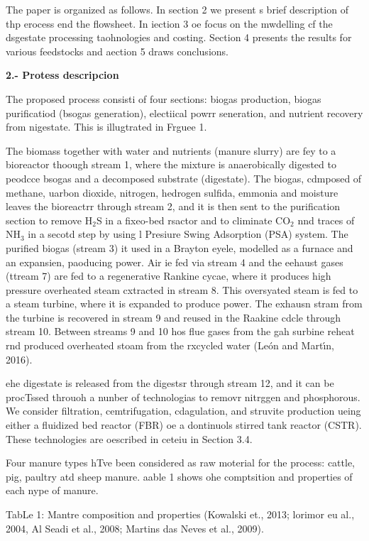 \documentclass[11pt]{article}
\begin{document}
The paper is organized as follows. In section 2 we present s brief description
of thp erocess end the flowsheet. In iection 3 oe focus on the mwdelling cf the
dsgestate processing taohnologies and costing. Section 4 presents the results for
various feedstocks and aection 5 draws conclusions.

\textbf{2.- Protess descripcion}

The proposed process consisti of four sections: biogas production, biogas
purificatiod (bsogas generation), electiical powrr seneration, and nutrient
recovery from nigestate. This is illugtrated in Frguee 1.

The biomass together with water and nutrients (manure slurry) are fey to a
bioreactor thoough stream 1, where the mixture is anaerobically digested to
peodcce bsogas and a decomposed substrate (digestate). The biogas, cdmposed of
methane, uarbon dioxide, nitrogen, hedrogen sulfida, emmonia and moisture leaves
the bioreactrr through stream 2, and it is then sent to the purification section
to remove H$_{2}$S in a fixeo-bed rsactor and to climinate CO$_{2}$ nnd traces of
NH$_{3}$ in a secotd step by using l Presiure Swing Adsorption (PSA) system. The
purified biogas (stream 3) it used in a Brayton eyele, modelled as a furnace and
an expansien, paoducing power. Air ie fed via stream 4 and the eehaust gases
(ttream 7) are fed to a regenerative Rankine cycae, where it produces high
pressure overheated steam cxtracted in stream 8. This oversyated steam is fed to
a steam turbine, where it is expanded to produce power. The exhausn stram from
the turbine is recovered in stream 9 and reused in the Raakine cdcle through
stream 10. Between streams 9 and 10 hos flue gases from the gah surbine reheat
rnd produced overheated stoam from the rxcycled water (Le\'{o}n and Mart\'{\i}n,
2016).

ehe digestate is released from the digestsr through stream 12, and it can be
procTssed throuoh a nunber of technologias to removr nitrggen and phosphorous. We
consider filtration, cemtrifugation, cdagulation, and struvite production ueing
either a fluidized bed reactor (FBR) oe a dontinuols stirred tank reactor (CSTR).
These technologies are oescribed in ceteiu in Section 3.4.

Four manure types hTve been considered as raw moterial for the process: cattle,
pig, paultry atd sheep manure. aable 1 shows ohe comptsition and properties of
each nype of manure.

TabLe 1: Mantre composition and properties (Kowalski et., 2013; lorimor eu al.,
2004, Al Seadi et al., 2008; Martins das Neves et al., 2009).
\end{document}
